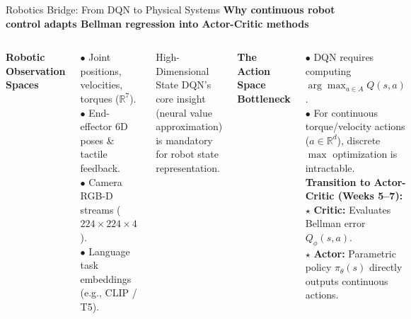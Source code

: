 \documentclass[aspectratio=169,10pt]{beamer}
\newcommand{\sectionlabel}[1]{%
  {\small\bfseries\color{islteal}#1}\par\vspace{0.14cm}%
}
\begin{document}
\begin{frame}{Robotics Bridge: From DQN to Physical Systems}
  \sectionlabel{Why continuous robot control adapts Bellman regression into Actor-Critic methods}

  \begin{columns}[T,onlytextwidth]
      {\small\bfseries\color{islnavy} Robotic Observation Spaces}\par\vspace{0.08cm}
      {\footnotesize
      $\bullet$ Joint positions, velocities, torques ($\mathbb{R}^7$).\\[2pt]
      $\bullet$ End-effector 6D poses \& tactile feedback.\\[2pt]
      $\bullet$ Camera RGB-D streams ($224 \times 224 \times 4$).\\[2pt]
      $\bullet$ Language task embeddings (e.g., CLIP / T5).\\[3pt]}
      \begin{block}{\footnotesize High-Dimensional State}
        DQN's core insight (neural value approximation) is mandatory for robot state representation.
      \end{block}

      {\small\bfseries\color{islteal} The Action Space Bottleneck}\par\vspace{0.08cm}
      {\footnotesize
      $\bullet$ DQN requires computing $\arg\max_{a \in A} Q(s, a)$.\\[2pt]
      $\bullet$ For continuous torque/velocity actions ($a \in \mathbb{R}^d$), discrete $\max$ optimization is intractable.\\[3pt]
      \textbf{Transition to Actor-Critic (Weeks 5--7):}\\[2pt]
      \quad $\star$ \textbf{Critic:} Evaluates Bellman error $Q_\phi(s, a)$.\\
      \quad $\star$ \textbf{Actor:} Parametric policy $\pi_\theta(s)$ directly outputs continuous actions.}
  \end{columns}
\end{frame}
\end{document}
